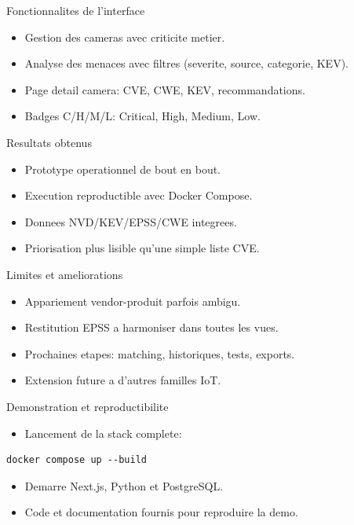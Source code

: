 \documentclass[aspectratio=169,11pt]{beamer}
\begin{document}
\begin{frame}{Fonctionnalites de l'interface}
\begin{itemize}
  \item Gestion des cameras avec criticite metier.
  \item Analyse des menaces avec filtres (severite, source, categorie, KEV).
  \item Page detail camera: CVE, CWE, KEV, recommandations.
  \item Badges C/H/M/L: Critical, High, Medium, Low.
\end{itemize}
\end{frame}

\begin{frame}{Resultats obtenus}
\begin{itemize}
  \item Prototype operationnel de bout en bout.
  \item Execution reproductible avec Docker Compose.
  \item Donnees NVD/KEV/EPSS/CWE integrees.
  \item Priorisation plus lisible qu'une simple liste CVE.
\end{itemize}
\end{frame}

\begin{frame}{Limites et ameliorations}
\begin{itemize}
  \item Appariement vendor-produit parfois ambigu.
  \item Restitution EPSS a harmoniser dans toutes les vues.
  \item Prochaines etapes: matching, historiques, tests, exports.
  \item Extension future a d'autres familles IoT.
\end{itemize}
\end{frame}

\begin{frame}[fragile]{Demonstration et reproductibilite}
\begin{itemize}
  \item Lancement de la stack complete:
\end{itemize}
\begin{verbatim}
docker compose up --build
\end{verbatim}
\begin{itemize}
  \item Demarre Next.js, Python et PostgreSQL.
  \item Code et documentation fournis pour reproduire la demo.
\end{itemize}
\end{frame}
\end{document}
